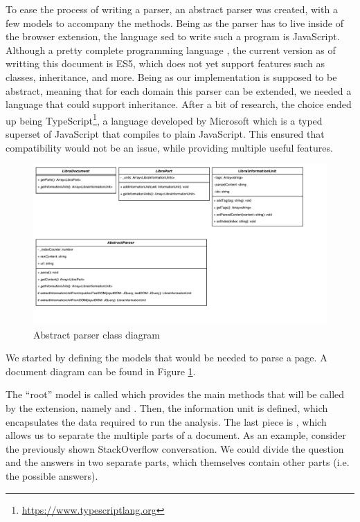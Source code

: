 To ease the process of writing a parser, an abstract parser was created, with a few models to accompany the methods. Being as the parser has to live inside of the browser extension, the language sed to write such a program is JavaScript. Although a pretty complete programming language , the current version as of writting this document is ES5, which does not yet support features such as classes, inheritance, and more. Being as our implementation is supposed to be abstract, meaning that for each domain this parser can be extended, we needed a language that could support inheritance. After a bit of research, the choice ended up being TypeScript\footnote{\url{https://www.typescriptlang.org}}, a language developed by Microsoft which is a typed superset of JavaScript that compiles to plain JavaScript. This ensured that compatibility would not be an issue, while providing multiple useful features. 

\begin{figure}[H]
\centering
\includegraphics[scale=0.5]{Figures/ClassUML}
\caption{Abstract parser class diagram}
\label{fig:abstractParserClassDiagram}
\end{figure}


We started by defining the models that would be needed to parse a page. A document diagram can be found in Figure \ref{fig:abstractParserClassDiagram}.

The ``root'' model is called  which provides the main methods that will be called by the extension, namely  and . Then, the information unit is defined, which encapsulates the data required to run the analysis. The last piece is , which allows us to separate the multiple parts of a document. As an example, consider the previously shown StackOverflow conversation. We could divide the question and the answers in two separate parts, which themselves contain other parts (i.e. the possible answers). 

